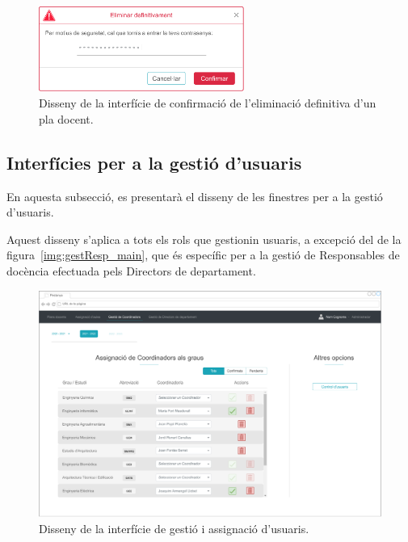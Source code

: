 \documentclass[a4paper,12pt]{ThesisStyle}
\begin{document}
\begin{figure}[H]
	\centering
	\includegraphics[width=0.6\textwidth]{assets/interfaces/administradors/plansDocents/confirmarEsborrarBox.pdf}
	\caption{\label{img:plansDocents_confirmarEsborrarBox}Disseny de la interfície de confirmació de l'eliminació definitiva d'un pla docent.}
\end{figure}

\subsection{Interfícies per a la gestió d'usuaris}
\label{subsec:interficies_gestio_usuaris}

En aquesta subsecció, es presentarà el disseny de les finestres per a la gestió d'usuaris.

Aquest disseny s'aplica a tots els rols que gestionin usuaris, a excepció del de la figura~\ref{img:gestResp_main}, que és específic per a la gestió de Responsables de docència efectuada pels Directors de departament.

\begin{figure}[H]
	\centering
	\includegraphics[width=\textwidth]{assets/interfaces/administradors/gestCoords/main.pdf}
	\caption{\label{img:gestCoords_main}Disseny de la interfície de gestió i assignació d'usuaris.}
\end{figure}
\end{document}
